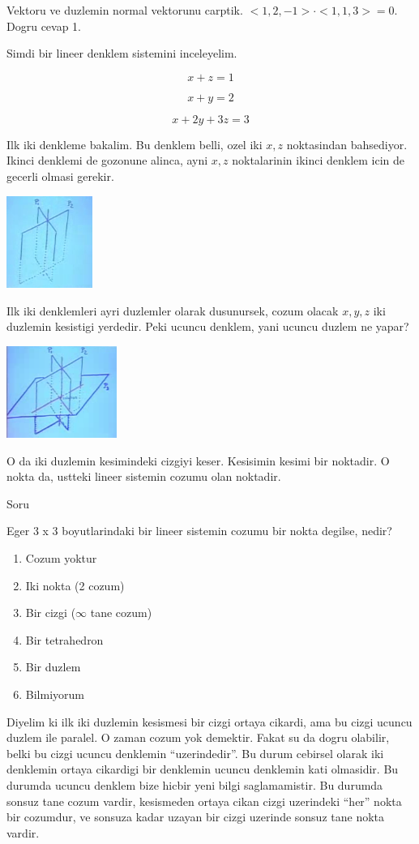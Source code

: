 \documentclass[12pt,fleqn]{article}
\begin{document}
Vektoru ve duzlemin normal vektorunu carptik. $<1,2,-1>\cdot<1,1,3> =
0$. 
Dogru cevap 1.

Simdi bir lineer denklem sistemini inceleyelim.

\[ x + z = 1  \]

\[ x + y = 2 \]

\[ x + 2y + 3z = 3 \]

Ilk iki denkleme bakalim. Bu denklem belli, ozel iki $x,z$ noktasindan
bahsediyor. Ikinci denklemi de gozonune alinca, ayni $x,z$ noktalarinin 
ikinci denklem icin de gecerli olmasi gerekir.

\includegraphics[height=3cm]{4_3.png}

Ilk iki denklemleri ayri duzlemler olarak dusunursek, cozum olacak $x,y,z$
iki duzlemin kesistigi yerdedir. Peki ucuncu denklem, yani ucuncu duzlem ne
yapar? 

\includegraphics[height=3cm]{4_4.png}

O da iki duzlemin kesimindeki cizgiyi keser. Kesisimin kesimi bir
noktadir. O nokta da, ustteki lineer sistemin cozumu olan noktadir. 

Soru 

Eger 3 x 3 boyutlarindaki bir lineer sistemin cozumu bir nokta degilse,
nedir? 

\begin{enumerate} 
\item Cozum yoktur
\item Iki nokta (2 cozum)
\item Bir cizgi ($\infty$ tane cozum)
\item Bir tetrahedron
\item Bir duzlem
\item Bilmiyorum
\end{enumerate}

Diyelim ki ilk iki duzlemin kesismesi bir cizgi ortaya cikardi, ama bu
cizgi ucuncu duzlem ile paralel. O zaman cozum yok demektir. Fakat su da
dogru olabilir, belki bu cizgi ucuncu denklemin ``uzerindedir''. Bu durum
cebirsel olarak iki denklemin ortaya cikardigi bir denklemin ucuncu
denklemin kati olmasidir. Bu durumda ucuncu denklem bize hicbir yeni bilgi
saglamamistir. Bu durumda sonsuz tane cozum vardir, kesismeden ortaya
cikan cizgi uzerindeki ``her'' nokta bir cozumdur, ve sonsuza kadar uzayan
bir cizgi uzerinde sonsuz tane nokta vardir. 
\end{document}
